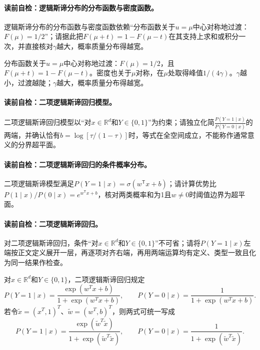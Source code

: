 \paragraph{读前自检：逻辑斯谛分布的分布函数与密度函数。}逻辑斯谛分布的分布函数与密度函数依赖“分布函数关于$u=\mu$中心对称地过渡：$F(\mu)=1/2$”；请据此把$F(\mu+t)=1-F(\mu-t)$在其支持上求和或积分一次，并直接核对$\gamma$越大，概率质量分布得越宽。\par

分布函数关于$u=\mu$中心对称地过渡：$F(\mu)=1/2$，且$F(\mu+t)=1-F(\mu-t)$。密度也关于$\mu$对称，在$\mu$处取得峰值$1/(4\gamma)$。$\gamma$越小，过渡越陡；$\gamma$越大，概率质量分布得越宽。

\paragraph{读前自检：二项逻辑斯谛回归模型。}二项逻辑斯谛回归模型以“对$x\in\mathbb R^d$和$Y\in\{0,1\}$”为约束；请独立化简$\frac{P(Y=1\mid x)}{P(Y=0\mid x)}$的两端，并确认恰有$b=\log[\tau/(1-\tau)]$时，等式在全空间成立，不能称作通常意义的分界超平面。\par
\paragraph{读前自检：二项逻辑斯谛回归的条件概率分布。}二项逻辑斯谛模型满足$P(Y=1\mid x)=\sigma(w^{\mathsf T}x+b)$；请计算优势比$P(1\mid x)/P(0\mid x)=e^{w^{\mathsf T}x+b}$，核对两类概率和为1且$w\ne0$时阈值边界为超平面。\par

\paragraph{读前自检：二项逻辑斯谛回归。}对二项逻辑斯谛回归，条件“对$x\in\mathbb R^d$和$Y\in\{0,1\}$”不可省；请将$P(Y=1\mid x)$左端按正文定义展开一层，再逐项对齐右端，再用两端运算均有定义、类型一致且化为同一结果作检查。\par

\begin{definition}[二项逻辑斯谛回归]\label{def:V2-C05-binary-logistic}
对$x\in\mathbb R^d$和$Y\in\{0,1\}$，二项逻辑斯谛回归规定
\[
P(Y=1\mid x)=\frac{\exp(w^Tx+b)}{1+\exp(w^Tx+b)},\qquad
P(Y=0\mid x)=\frac{1}{1+\exp(w^Tx+b)}.
\]
若令$\widetilde x=(x^T,1)^T$、$\widetilde w=(w^T,b)^T$，则两式可统一写成
\[
P(Y=1\mid x)=\frac{\exp(\widetilde w^T\widetilde x)}
{1+\exp(\widetilde w^T\widetilde x)},\qquad
P(Y=0\mid x)=\frac{1}{1+\exp(\widetilde w^T\widetilde x)}.
\]
\end{definition}

